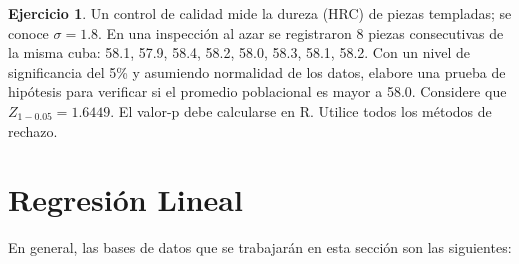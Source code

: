 \documentclass[
  11pt,
]{book}
\theoremstyle{definition}
\theoremstyle{definition}
\theoremstyle{definition}
\newtheorem{exercise}{Ejercicio}[chapter]
\theoremstyle{definition}
\theoremstyle{remark}
\begin{document}
\begin{exercise}
Un control de calidad mide la dureza (HRC) de piezas templadas; se conoce \(\sigma=1.8\). En una inspección al azar se registraron 8 piezas consecutivas de la misma cuba: 58.1, 57.9, 58.4, 58.2, 58.0, 58.3, 58.1, 58.2. Con un nivel de significancia del 5\% y asumiendo normalidad de los datos, elabore una prueba de hipótesis para verificar si el promedio poblacional es mayor a 58.0. Considere que \(Z_{1-0.05}=1.6449\). El valor-p debe calcularse en R. Utilice todos los métodos de rechazo.
\end{exercise}

\chapter{Regresión Lineal}\label{regresion-lineal}

En general, las bases de datos que se trabajarán en esta sección son las siguientes:
\end{document}
